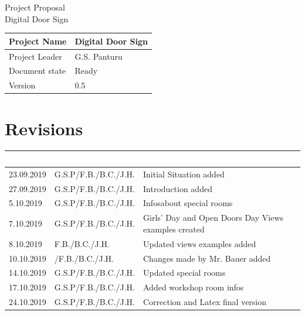 \documentclass{article}
\newcommand{\projectname}{Digital Door Sign}
\newcommand{\productname}{Digital Door Sign}
\newcommand{\projectleader}{G.S. Panturu}
\newcommand{\documentstatus}{Ready}
\newcommand{\version}{0.5}
\begin{document}
\begin {center}
{\Huge Project Proposal} \\[3em]
{\LARGE \productname} \\[3em]
\date{October 2019}
\begin{tabular}{|l|l|}
\hline
Project Name & \projectname \\ \hline
Project Leader & \projectleader \\ \hline
Document state & \documentstatus \\ \hline
Version & \version \\ \hline
\end{tabular}
\end{center}
\pagebreak
\tableofcontents

\pagebreak
\section{Revisions}
\begin{tabular}{|l|l|l|}
\hline
\cellcolor[gray]{0.5}\textcolor{white}{Date} & \cellcolor[gray]{0.5}\textcolor{white}{Author} & \cellcolor[gray]{0.5}\textcolor{white}{Change} \\ \hline
23.09.2019&G.S.P/F.B./B.C./J.H.&Initial Situation added \\ \hline
27.09.2019&G.S.P/F.B./B.C./J.H.& Introduction added \\ \hline
5.10.2019&G.S.P/F.B./B.C./J.H.&Infosabout special rooms \\ \hline
7.10.2019&G.S.P/F.B./B.C./J.H.& Girls' Day and Open Doors Day Views examples created\\ \hline
8.10.2019&F.B./B.C./J.H.&Updated views examples added \\ \hline
10.10.2019&/F.B./B.C./J.H.&Changes made by Mr. Bauer added \\ \hline
14.10.2019&G.S.P/F.B./B.C./J.H.&Updated special rooms\\ \hline
17.10.2019&G.S.P/F.B./B.C./J.H.&Added workshop room infos\\ \hline
24.10.2019&G.S.P/F.B./B.C./J.H.& Correction and Latex final version \\ \hline
\end{tabular}
\pagebreak
\end{document}
